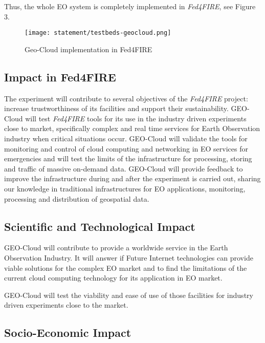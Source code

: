 Thus, the whole \ac{EO} system is completely implemented in \emph{Fed4FIRE}, see Figure 3.

\begin{figure}[!h]
\begin{center}
\texttt{[image: statement/testbeds-geocloud.png]}
\caption{Geo-Cloud implementation in Fed4FIRE}
\label{fig:intr-testbeds-geocloud}
\end{center}
\end{figure}




\subsection{Impact in Fed4FIRE}
The experiment will contribute to several objectives of the \emph{Fed4FIRE} project:
increase trustworthiness of its facilities and support their
sustainability. GEO-Cloud will test \emph{Fed4FIRE} tools for its use in the industry
driven experiments close to market, specifically complex and real time services
for Earth Observation industry when critical situations occur.
GEO-Cloud will validate the tools for monitoring and control of cloud computing
and networking in EO services for emergencies and will test the limits of the
infrastructure for processing, storing and traffic of massive on-demand
data. GEO-Cloud will provide feedback to improve the infrastructure during and
after the experiment is carried out, sharing our knowledge in traditional
infrastructures for \ac{EO} applications, monitoring, processing and
distribution of geospatial data.

\subsection{Scientific and Technological Impact}

GEO-Cloud will contribute to provide a worldwide service in the Earth
Observation Industry. It will answer if Future Internet technologies can provide
viable solutions for the complex \ac{EO} market and to find the limitations of
the current cloud computing technology for its application in \ac{EO} market.

GEO-Cloud will test the viability and ease of use of those facilities for
industry driven experiments close to the market.

\subsection{Socio-Economic Impact}

